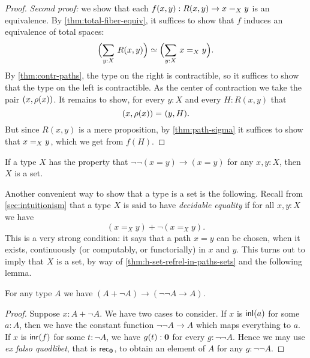 \begin{proof}
  \emph{Second proof:} we show that each $f(x,y) : R(x,y) \to \id[X]{x}{y}$ is an equivalence.
  By \autoref{thm:total-fiber-equiv}, it suffices to show that $f$ induces an equivalence of total spaces:
  \begin{equation*}
    \eqv{\Parens{\sm{y:X}R(x,y)}}{\Parens{\sm{y:X}\id[X]{x}{y}}}.
  \end{equation*}
  By \autoref{thm:contr-paths}, the type on the right is contractible, so it
  suffices to show that the type on the left is contractible. As the center of
  contraction we take the pair $\pairr{x,\rho(x)}$.  It remains to show, for
  every ${y:X}$ and every ${H:R(x,y)}$ that
  \begin{equation*}
    \id{\pairr{x,\rho(x)}}{\pairr{y,H}}.
  \end{equation*}
  But since $R(x,y)$ is a mere proposition, by \autoref{thm:path-sigma} it suffices to show that
  $\id[X]{x}{y}$, which we get from $f(H)$.
\end{proof}

\begin{cor}\label{notnotstable-equality-to-set}
  If a type $X$ has the property that $\neg\neg(x=y)\to(x=y)$ for any $x,y:X$, then $X$ is a set.
\end{cor}

Another convenient way to show that a type is a set is the following.
Recall from \autoref{sec:intuitionism} that a type $X$ is said to have \emph{decidable equality}
%
if for all $x, y : X$ we have
\[(x =_X y) + \neg (x =_X y).\]
%
%
This is a very strong condition: it says that a path $x=y$ can be chosen, when it exists, continuously (or computably, or functorially) in $x$ and $y$.
This turns out to imply that $X$ is a set, by way of \autoref{thm:h-set-refrel-in-paths-sets} and the following lemma.

\begin{lem}
For any type $A$ we have $(A+\neg A)\to(\neg\neg A\to A)$.
\end{lem}

\begin{proof}
Suppose $x:A+\neg A$. We have two cases to consider.
If $x$ is $\inl(a)$ for some $a:A$, then we have the constant function $\neg\neg A
\to A$ which maps everything to $a$. If $x$ is $\inr(f)$ for some $t:\neg A$,
we have $g(t):\emptyt$ for every $g:\neg\neg A$. Hence we may use
\emph{ex falso quodlibet}, that is $\rec{\emptyt}$, to obtain an element of $A$ for any $g:\neg\neg A$.
\end{proof}

